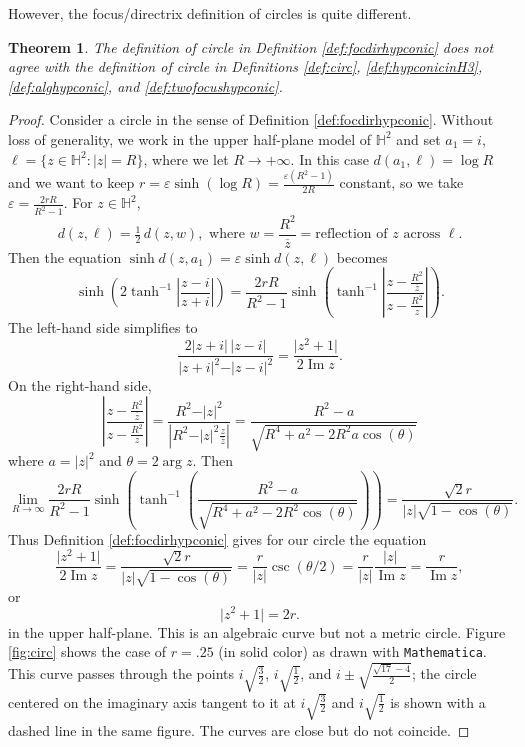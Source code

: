 \documentclass[12pt]{amsart}
\newtheorem{theorem}{Theorem}
\theoremstyle{definition}
\begin{document}
However, the focus/directrix definition of circles is quite different.
\begin{theorem}
\label{thm:twocircles}
The definition of circle in Definition \ref{def:focdirhypconic} does
\emph{not} agree with the definition of circle in Definitions
\ref{def:circ}, \ref{def:hypconicinH3},
\ref{def:alghypconic}, and \ref{def:twofocushypconic}.
\end{theorem}
\begin{proof}
Consider a circle in the sense of Definition
\ref{def:focdirhypconic}.  Without loss of generality, we work in the
upper half-plane model of ${\mathbb H}^2$ and set $a_1=i$, $\ell = \{z\in
{\mathbb H}^2 : |z| = R\}$, where we let $R\to +\infty$.  In this case
$d(a_1,\ell) = \log R$ and we want to keep $r=\varepsilon \sinh(\log
R) = \frac{\varepsilon(R^2-1)}{2R}$ constant, so we take
$\varepsilon = \frac{2rR}{R^2-1}$.  For $z\in {\mathbb H}^2$,
\[
d(z,\ell)=\tfrac12 \,d(z,w),\text{ where }w=\frac{R^2}{\overline z}
=\text{reflection of }z\text{ across }\ell.
\]
Then the equation $\sinh d(z,a_1)=\varepsilon \sinh d(z, \ell)$
becomes
\[
\sinh\left(2\tanh^{-1}\left\vert\frac{z-i}{z+i}\right\vert\right)
= \frac{2rR}{R^2-1}\sinh\left(
\tanh^{-1}\left\vert\frac{z-\frac{R^2}{\overline z}}{z-\frac{R^2}{z}}
\right\vert\right) .
\]
The left-hand side simplifies to
\[
\frac{2\vert z+i\vert\,\vert z-i\vert}{\vert z+i\vert^2 -
 \vert z-i\vert^2} = \frac{\vert z^2+1\vert}{2{\operatorname{Im}} z}.
\]
On the right-hand side,
\[
\left\vert\frac{z-\frac{R^2}{\overline z}}{z-\frac{R^2}{z}}
\right\vert = \frac{R^2 - \vert z\vert^2}{\left\vert R^2 - \vert z\vert^2 
\frac{z}{\overline z}\right\vert} = \frac{R^2-a}{\sqrt{R^4
+a^2 -2R^2a\cos(\theta)}}
\]
where $a= \vert z\vert^2$ and $\theta = 2\arg z$.  Then
\[
\lim_{R\to \infty}
\frac{2rR}{R^2-1}\sinh\left(\tanh^{-1}\left(\frac{R^2-a}{\sqrt{R^4
+a^2 -2R^2\cos(\theta)}}\right)\right) 
=\frac{\sqrt{2}r}{|z|\sqrt{1-\cos(\theta)}}.
\]
Thus Definition \ref{def:focdirhypconic} gives for our circle
the equation
\[
\frac{\vert z^2+1\vert}{2{\operatorname{Im}}
  z}=\frac{\sqrt{2}r}{|z|\sqrt{1-\cos(\theta)}}
= \frac{r}{|z|}\csc(\theta/2)= \frac{r}{|z|}\frac{|z|}{{\operatorname{Im}} z} =
\frac{r}{{\operatorname{Im}} z},
\]
or
\begin{equation}
  \vert z^2+1\vert = {2r}.
  \label{eq:focdircircle}
\end {equation}   
in the upper half-plane.  This is an algebraic curve but not a metric
circle. Figure \ref{fig:circ} shows the case of $r=.25$ (in solid
color) as drawn with
\texttt{Mathematica}. This curve passes through the points
$i\sqrt{\frac{3}{2}}$, $i\sqrt{\frac{1}{2}}$, and $i \pm 
\sqrt{\frac{\sqrt{17}-4}{2}}$; the circle centered on the imaginary axis
tangent to it at $i\sqrt{\frac{3}{2}}$ and $i\sqrt{\frac{1}{2}}$
is shown with a dashed line in the same figure. The curves are close
but do not coincide.
\end{proof}
\end{document}

